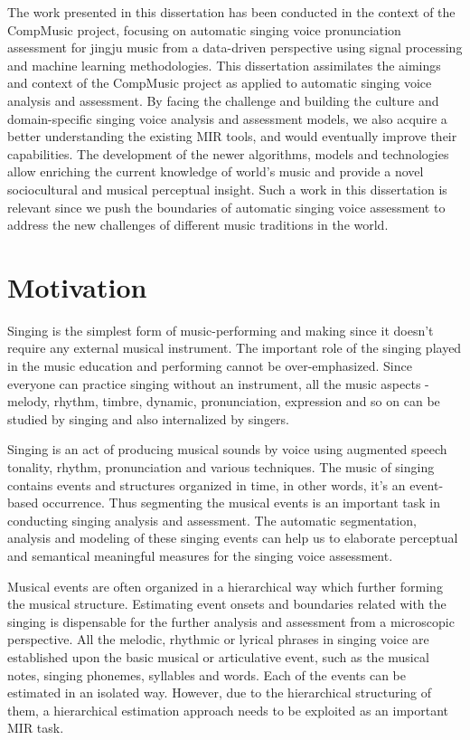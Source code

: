 The work presented in this dissertation has been conducted in the context of the CompMusic project, focusing on automatic singing voice pronunciation assessment for jingju music from a data-driven perspective using signal processing and machine learning methodologies. This dissertation assimilates the aimings and context of the CompMusic project as applied to automatic singing voice analysis and assessment.  By facing the challenge and building the culture and domain-specific singing voice analysis and assessment models, we also acquire a better understanding the existing MIR tools, and would eventually improve their capabilities. The development of the newer algorithms, models and technologies allow enriching the current knowledge of world's music and provide a novel sociocultural and musical perceptual insight. Such a work in this dissertation is relevant since we push the boundaries of automatic singing voice assessment to address the new challenges of different music traditions in the world. 

\section{Motivation}
Singing is the simplest form of music-performing and making since it doesn't require any external musical instrument. The important role of the singing played in the music education and performing cannot be over-emphasized. Since everyone can practice singing without an instrument, all the music aspects - melody, rhythm, timbre, dynamic, pronunciation, expression and so on can be studied by singing and also internalized by singers.

Singing is an act of producing musical sounds by voice using augmented speech tonality, rhythm, pronunciation and various techniques. The music of singing contains events and structures organized in time, in other words, it's an event-based occurrence. Thus segmenting the musical events is an important task in conducting singing analysis and assessment. The automatic segmentation, analysis and modeling of these singing events can help us to elaborate perceptual and semantical meaningful measures for the singing voice assessment.

Musical events are often organized in a hierarchical way which further forming the musical structure.  Estimating event onsets and boundaries related with the singing is dispensable for the further analysis and assessment from a microscopic perspective. All the melodic, rhythmic or lyrical phrases in singing voice are established upon the basic musical or articulative event, such as the musical notes, singing phonemes, syllables and words. Each of the events can be estimated in an isolated way. However, due to the hierarchical structuring of them, a hierarchical estimation approach needs to be exploited as an important MIR task.

